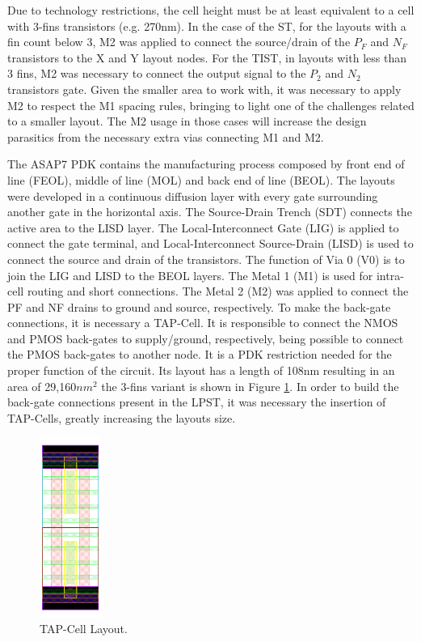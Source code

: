 \documentclass[pgmicro,diss,english]{iiufrgs}
\begin{document}


Due to technology restrictions, the cell height must be at least equivalent to a cell with 3-fins transistors (e.g. 270nm). In the case of the ST, for the layouts with a fin count below 3, M2 was applied to connect the source/drain of the ${P_F}$ and ${N_F}$ transistors to the X and Y layout nodes. For the TIST, in layouts with less than 3 fins, M2 was necessary to connect the output signal to the $P_2$ and $N_2$ transistors gate. Given the smaller area to work with, it was necessary to apply M2 to respect the M1 spacing rules, bringing to light one of the challenges related to a smaller layout. The M2 usage in those cases will increase the design parasitics from the necessary extra vias connecting M1 and M2.


The ASAP7 PDK contains the manufacturing process composed by front end of line (FEOL), middle of line (MOL) and back end of line (BEOL). The layouts were developed in a continuous diffusion layer with every gate surrounding another gate in the horizontal axis. The Source-Drain Trench (SDT) connects the active area to the LISD layer. The Local-Interconnect Gate (LIG) is applied to connect the gate terminal, and Local-Interconnect Source-Drain (LISD) is used to connect the source and drain of the transistors. The function of Via 0 (V0) is to join the LIG and LISD to the BEOL layers. The Metal 1 (M1) is used for intra-cell routing and short connections. The Metal 2 (M2) was applied to connect the PF and NF drains to ground and source, respectively. To make the back-gate connections, it is necessary a TAP-Cell. It is responsible to connect the NMOS and PMOS back-gates to supply/ground, respectively, being possible to connect the PMOS back-gates to another node. It is a PDK restriction needed for the proper function of the circuit. Its layout has a length of 108nm resulting in an area of 29,160$nm^{2}$ the 3-fins variant is shown in Figure \ref{tap}. In order to build the back-gate connections present in the LPST, it was necessary the insertion of TAP-Cells, greatly increasing the layouts size.

\begin{figure}[t]
\centering
\includegraphics[width=0.18\textwidth]{TAP.png}
\caption{TAP-Cell Layout.}
\label{tap}
\end{figure}
\end{document}
